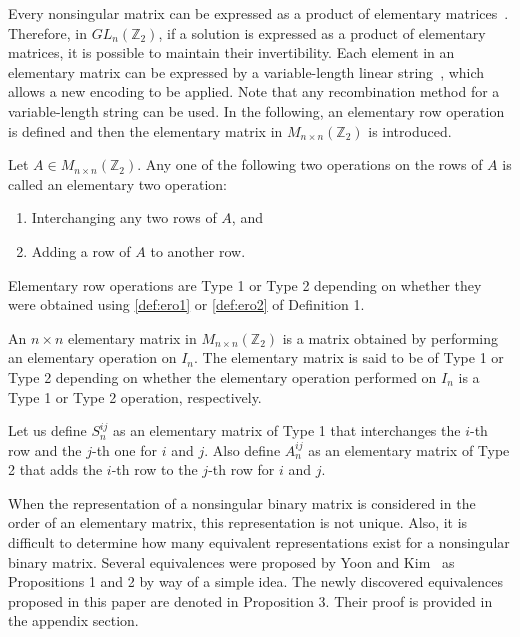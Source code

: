 Every nonsingular matrix can be expressed as a product of elementary matrices~\cite{friedberglinear}. Therefore, in $ GL_n\left(\mathbb{Z}_2\right) $, if a solution is expressed as a product of elementary matrices, it is possible to maintain their invertibility. Each element in an elementary matrix can be expressed by a variable-length linear string~\cite{yoon2014mathematical}, which allows a new encoding to be applied. Note that any recombination method for a variable-length string can be used.
In the following, an elementary row operation is defined and then the elementary matrix in $ M_{n\times n}\left(\mathbb{Z}_2\right) $ is introduced.
\begin{definition}
	Let $ A\in M_{n\times n}\left(\mathbb{Z}_2\right) $. Any one of the following two operations on the rows of $ A $ is called an elementary two operation:
	\begin{enumerate}[label=(\roman*)]
		\item \label{def:ero1} Interchanging any two rows of $ A $, and
		\item \label{def:ero2} Adding a row of $ A $ to another row.
	\end{enumerate}
\end{definition}
Elementary row operations are Type 1 or Type 2 depending on whether they were obtained using \ref{def:ero1} or \ref{def:ero2} of Definition 1.
\begin{definition}
	An $ n\times n $ elementary matrix in $ M_{n\times n}(\mathbb{Z}_2)$ is a matrix obtained by performing an elementary operation on $ I_n $. The elementary matrix is said to be of Type 1 or Type 2 depending on whether the elementary operation performed on $I_n$ is a Type 1 or Type 2 operation, respectively.
\end{definition}

Let us define $ S_n^{ij} $ as an elementary matrix of Type 1 that interchanges the $ i $-th row and the $ j $-th one for $ i $ and $ j $. Also define $ A_n^{ij} $ as an elementary matrix of Type 2 that adds the $ i $-th row to the $ j $-th row for $ i $ and $ j $.

When the representation of a nonsingular binary matrix is considered in the order of an elementary matrix, this representation is not unique. Also, it is difficult to determine how many equivalent representations exist for a nonsingular binary matrix. Several equivalences were proposed by Yoon and Kim~\cite{yoon2014mathematical} as Propositions 1 and 2 by way of a simple idea. The newly discovered equivalences proposed in this paper are denoted in Proposition 3. Their proof is provided in the appendix section.

